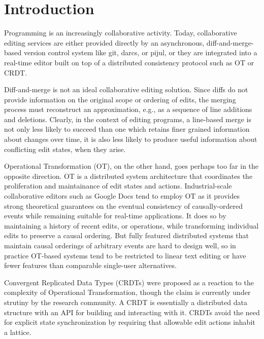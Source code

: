 
\section{Introduction}%
\label{sec:Introduction}


Programming is an increasingly collaborative activity.
Today, collaborative editing services are either provided directly by an asynchronous,
diff-and-merge-based version control system like git, darcs, or pijul,
or they are integrated into a real-time editor built on top of a distributed consistency protocol such as OT or CRDT.

Diff-and-merge is not an ideal collaborative editing solution.
Since diffs do not provide information on the original scope or ordering of edits,
the merging process must reconstruct an approximation, e.g., as a sequence of line additions and deletions.
Clearly, in the context of editing programs,
a line-based merge is not only less likely to succeed than one which retains finer grained information about changes over time,
it is also less likely to produce useful information about conflicting edit states, when they arise.

Operational Transformation (OT), on the other hand, goes perhaps too far in the opposite direction.
OT is a distributed system architecture that coordinates the proliferation and maintainance of edit states and actions.
Industrial-scale collaborative editors such as Google Docs tend to employ OT
as it provides strong theoretical guarantees on the eventual consistency of causally-ordered events
while remaining suitable for real-time applications.
It does so by maintaining a history of recent edits, or operations, while transforming individual edits to preserve a causal ordering.
But fully featured distributed systems that maintain causal orderings of arbitrary events are hard to design well,
so in practice OT-based systems tend to be restricted to linear text editing or have fewer features than comparable single-user alternatives.

Convergent Replicated Data Types (CRDTs) were proposed as a reaction to the complexity of Operational Transformation,
though the claim is currently under strutiny by the research community.
A CRDT is essentially a distributed data structure with an API for building and interacting with it.
CRDTs avoid the need for explicit state synchronization by requiring that allowable edit actions inhabit a lattice.

